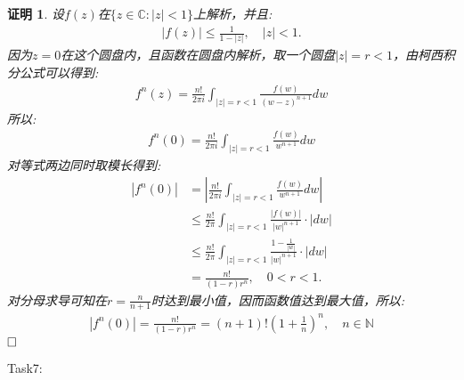 \documentclass{ctexart}
\newcommand{\。}{．} %
\newenvironment{lanse}{
    \begin{tcolorbox}[breakable,enhanced, colback=qlan, boxrule=0pt, frame hidden,
        borderline west={0.7mm}{0.1mm}{slan}]
    }
    {\end{tcolorbox}}
\theoremstyle{t} %
\newtheorem*{zmhj}{\color{slan} 证明}
\newenvironment{zm}{\begin{lanse}\begin{zmhj}}{$\hfill \square$\end{zmhj}\end{lanse}}
\begin{document}
\begin{zm}
    设$f(z)$在$\{z\in\mathbb{C}:|z|<1\}$上解析，并且:
    \begin{align*}
        |f(z)|\le \frac{1}{1-|z|},\quad |z|<1.
    \end{align*}
    因为$z=0$在这个圆盘内，且函数在圆盘内解析，取一个圆盘$|z|=r<1$，由柯西积分公式可以得到:
    \begin{align*}
        f^{n}(z)=\frac{n!}{2\pi i}\int_{|z|=r<1}\frac{f(w)}{(w-z)^{n+1}}dw
    \end{align*}
    所以:
    \begin{align*}
        f^{n}(0)=\frac{n!}{2\pi i}\int_{|z|=r<1}\frac{f(w)}{w^{n+1}}dw
    \end{align*}
    对等式两边同时取模长得到:
    \begin{align*}
        \left|f^{n}(0)\right|&=\left|\frac{n!}{2\pi i}\int_{|z|=r<1}\frac{f(w)}{w^{n+1}}dw\right|\\
        &\le \frac{n!}{2\pi }\int_{|z|=r<1}\frac{|f(w)|}{|w|^{n+1}}\cdot|dw|\\
        &\le \frac{n!}{2\pi }\int_{|z|=r<1}\frac{1-\frac{1}{|w|}}{|w|^{n+1}}\cdot|dw|\\
        &=\frac{n!}{(1-r)r^n},\quad 0<r<1.
    \end{align*}
    对分母求导可知在$r=\frac{n}{n+1}$时达到最小值，因而函数值达到最大值，所以:
    \begin{align*}
        \left|f^{n}(0)\right|=\frac{n!}{(1-r)r^n}=(n+1)!\left(1+\frac{1}{n}\right)^n,\quad n\in\mathbb{N}
    \end{align*}
\end{zm}
Task7:
\end{document}
